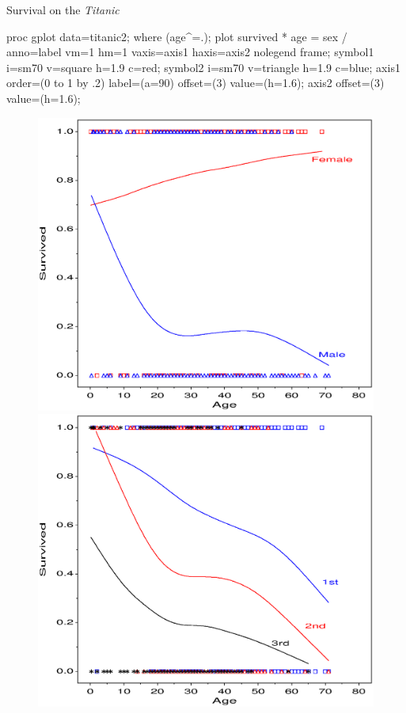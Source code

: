 \begin{Example}[titanic4]{Survival on the \emph{Titanic}}
\begin{listing}
proc gplot data=titanic2;
   where (age^=.);
   plot survived * age = sex /
       anno=label vm=1 hm=1 vaxis=axis1 haxis=axis2 nolegend frame;
   symbol1 i=sm70 v=square   h=1.9 c=red;
   symbol2 i=sm70 v=triangle h=1.9 c=blue;
   axis1 order=(0 to 1 by .2) label=(a=90) offset=(3) value=(h=1.6);
   axis2 offset=(3) value=(h=1.6);
\end{listing}
\begin{figure}[htb]
 \begin{minipage}[t]{.49\linewidth}
  \includegraphics[width=1\linewidth]{ch6/fig/psurvive1}
 \end{minipage}%
 \hfill
 \begin{minipage}[t]{.49\linewidth}
  \includegraphics[width=1\linewidth]{ch6/fig/psurvive2}

\end{minipage}
\end{figure}
\end{Example}
